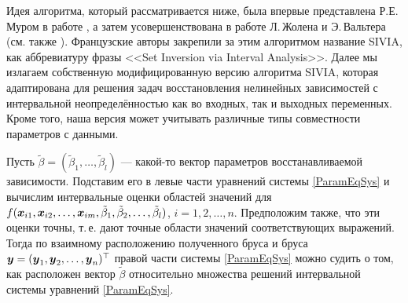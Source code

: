 \documentclass[a5paper,openany]{book}
\newcommand{\mbf}[1]{\protect\text{\boldmath$#1$}}
\begin{document}
Идея алгоритма, который рассматривается ниже, была впервые представлена Р.Е.\,Муром 
в работе  \cite{Moore1992}, а затем усовершенствована в работе Л.\,Жолена и 
Э.\,Вальтера  \cite{JaulinWalter}  (см. также \cite{ApplInteAnal}). Французские 
авторы закрепили за этим алгоритмом название SIVIA, как аббревиатуру фразы <<Set 
Inversion via Interval Analysis>>. Далее мы излагаем собственную модифицированную 
версию алгоритма SIVIA, которая адаптирована для решения задач восстановления 
нелинейных зависимостей с интервальной неопределённостью как во входных, так 
и выходных переменных. Кроме того, наша версия может учитывать различные типы 
совместности параметров с данными.  
   
Пусть $\tilde{\beta} = (\tilde{\beta}_{1}, \ldots, \tilde{\beta}_{l})$ --- какой-то 
вектор  параметров  восстанавливаемой  зависимости.  Подставим его  в левые  части 
уравнений системы \eqref{ParamEqSys} и вычислим интервальные оценки областей значений 
для $f(\mbf{x}_{i1}, \mbf{x}_{i2}, \ldots, \mbf{x}_{im}, \tilde{\beta}_{1}, 
\tilde{\beta}_{2}, \ldots, \tilde{\beta}_{l})$, $i = 1,2,\ldots,n$. Предположим 
также, что эти оценки точны, т.\,е. дают точные области значений соответствующих 
выражений. Тогда по взаимному расположению полученного бруса и бруса $\mbf{y} = 
(\mbf{y}_{1}, \mbf{y}_{2}, \ldots, \mbf{y}_{n})^\top$ правой части системы 
\eqref{ParamEqSys} можно судить о том, как расположен вектор $\tilde{\beta}$ 
относительно множества решений интервальной системы уравнений \eqref{ParamEqSys}. 
  
\end{document}

